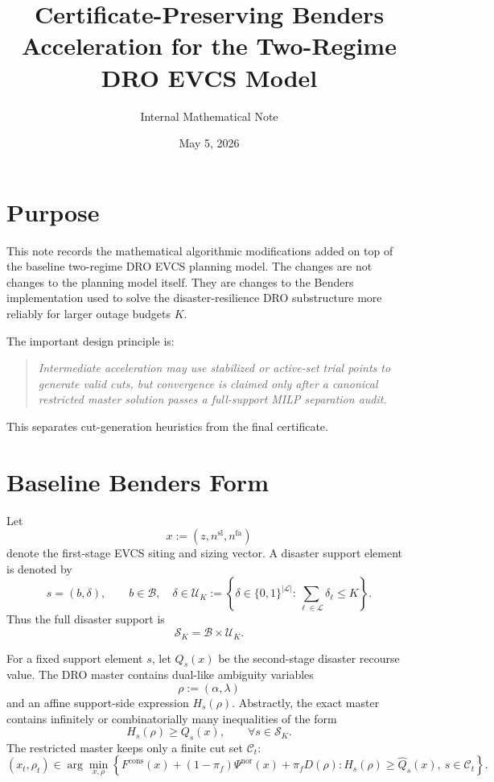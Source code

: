 \documentclass[11pt]{article}
\title{Certificate-Preserving Benders Acceleration for the Two-Regime DRO EVCS Model}
\author{Internal Mathematical Note}
\date{May 5, 2026}
\newcommand{\Bset}{\mathcal B}
\newcommand{\Lset}{\mathcal L}
\newcommand{\Sset}{\mathcal S}
\newcommand{\Uset}{\mathcal U}
\newcommand{\Cset}{\mathcal C}
\begin{document}
\maketitle

\section{Purpose}

This note records the mathematical algorithmic modifications added on top of
the baseline two-regime DRO EVCS planning model.  The changes are not changes
to the planning model itself.  They are changes to the Benders implementation
used to solve the disaster-resilience DRO substructure more reliably for larger
outage budgets $K$.

The important design principle is:
\begin{quote}
\emph{Intermediate acceleration may use stabilized or active-set trial points
to generate valid cuts, but convergence is claimed only after a canonical
restricted master solution passes a full-support MILP separation audit.}
\end{quote}

This separates cut-generation heuristics from the final certificate.

\section{Baseline Benders Form}

Let
\[
    x := (z,n^{\mathrm{sl}},n^{\mathrm{fa}})
\]
denote the first-stage EVCS siting and sizing vector.  A disaster support
element is denoted by
\[
    s=(b,\delta), \qquad
    b\in\Bset,\quad
    \delta\in\Uset_K
    :=\left\{\delta\in\{0,1\}^{|\Lset|}:
    \sum_{\ell\in\Lset}\delta_\ell\le K\right\}.
\]
Thus the full disaster support is
\[
    \Sset_K = \Bset\times \Uset_K .
\]

For a fixed support element $s$, let $Q_s(x)$ be the second-stage disaster
recourse value.  The DRO master contains dual-like ambiguity variables
\[
    \rho := (\alpha,\lambda)
\]
and an affine support-side expression $H_s(\rho)$.  Abstractly, the exact
master contains infinitely or combinatorially many inequalities of the form
\begin{equation}
    H_s(\rho) \ge Q_s(x), \qquad \forall s\in\Sset_K .
    \label{eq:exact-master}
\end{equation}
The restricted master keeps only a finite cut set $\Cset_t$:
\begin{equation}
    (x_t,\rho_t)\in
    \arg\min_{x,\rho}
    \left\{
    F^{\mathrm{cons}}(x)
    +(1-\pi_f)\Psi^{\mathrm{nor}}(x)
    +\pi_f D(\rho)
    :
    H_s(\rho)\ge \widehat Q_s(x),\ s\in\Cset_t
    \right\}.
    \label{eq:rmp}
\end{equation}
\end{document}
